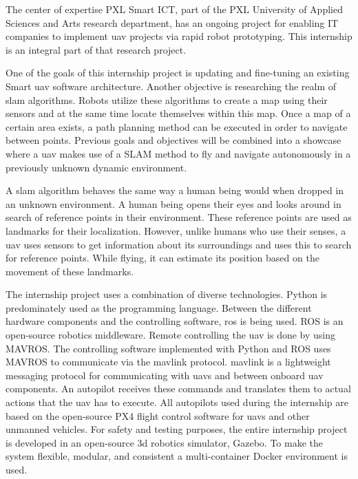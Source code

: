 The center of expertise PXL Smart ICT, part of the PXL University of Applied Sciences and Arts research department, has an ongoing project for enabling IT companies to implement \ac{uav} projects via rapid robot prototyping. This internship is an integral part of that research project.

One of the goals of this internship project is updating and fine\hyp{}tuning an existing Smart \acs{uav} software architecture. Another objective is researching the realm of \ac{slam} algorithms. Robots utilize these algorithms to create a map using their sensors and at the same time locate themselves within this map. Once a map of a certain area exists, a path planning method can be executed in order to navigate between points. Previous goals and objectives will be combined into a showcase where a \acs{uav} makes use of a SLAM method to fly and navigate autonomously in a previously unknown dynamic environment.

A \acs{slam} algorithm behaves the same way a human being would when dropped in an unknown environment. A human being opens their eyes and looks around in search of reference points in their environment. These reference points are used as landmarks for their localization. However, unlike humans who use their senses, a \acs{uav} uses sensors to get information about its surroundings and uses this to search for reference points. While flying, it can estimate its position based on the movement of these landmarks.

The internship project uses a combination of diverse technologies. Python is predominately used as the programming language. Between the different hardware components and the controlling software, \acs{ros} is being used. ROS is an open\hyp{}source robotics middleware. Remote controlling the \acs{uav} is done by using MAVROS. The controlling software implemented with Python and ROS uses MAVROS to communicate via the \acs{mavlink} protocol. \acs{mavlink} is a lightweight messaging protocol for communicating with \acsp{uav} and between onboard \acs{uav} components. An autopilot receives these commands and translates them to actual actions that the \acs{uav} has to execute. All autopilots used during the internship are based on the open\hyp{}source PX4 flight control software for \acsp{uav} and other unmanned vehicles. For safety and testing purposes, the entire internship project is developed in an open\hyp{}source \acs{3d} robotics simulator, Gazebo. To make the system flexible, modular, and consistent a multi\hyp{}container Docker environment is used.